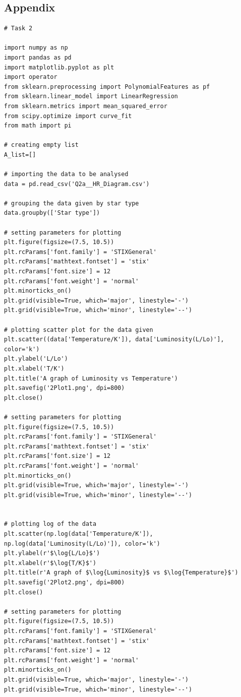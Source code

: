 \documentclass[12pt, a4paper]{article}
\begin{document}
\subsection{Appendix}
\begin{verbatim}
# Task 2

import numpy as np
import pandas as pd
import matplotlib.pyplot as plt
import operator
from sklearn.preprocessing import PolynomialFeatures as pf
from sklearn.linear_model import LinearRegression
from sklearn.metrics import mean_squared_error
from scipy.optimize import curve_fit
from math import pi

# creating empty list
A_list=[]

# importing the data to be analysed
data = pd.read_csv('Q2a__HR_Diagram.csv')

# grouping the data given by star type
data.groupby(['Star type'])

# setting parameters for plotting
plt.figure(figsize=(7.5, 10.5))
plt.rcParams['font.family'] = 'STIXGeneral'
plt.rcParams['mathtext.fontset'] = 'stix'
plt.rcParams['font.size'] = 12
plt.rcParams['font.weight'] = 'normal'
plt.minorticks_on()
plt.grid(visible=True, which='major', linestyle='-')
plt.grid(visible=True, which='minor', linestyle='--')

# plotting scatter plot for the data given
plt.scatter((data['Temperature/K']), data['Luminosity(L/Lo)'], color='k')
plt.ylabel('L/Lo')
plt.xlabel('T/K')
plt.title('A graph of Luminosity vs Temperature')
plt.savefig('2Plot1.png', dpi=800)
plt.close()

# setting parameters for plotting
plt.figure(figsize=(7.5, 10.5))
plt.rcParams['font.family'] = 'STIXGeneral'
plt.rcParams['mathtext.fontset'] = 'stix'
plt.rcParams['font.size'] = 12
plt.rcParams['font.weight'] = 'normal'
plt.minorticks_on()
plt.grid(visible=True, which='major', linestyle='-')
plt.grid(visible=True, which='minor', linestyle='--')


# plotting log of the data
plt.scatter(np.log(data['Temperature/K']), np.log(data['Luminosity(L/Lo)']), color='k')
plt.ylabel(r'$\log{L/Lo}$')
plt.xlabel(r'$\log{T/K}$')
plt.title(r'A graph of $\log{Luminosity}$ vs $\log{Temperature}$')
plt.savefig('2Plot2.png', dpi=800)
plt.close()

# setting parameters for plotting
plt.figure(figsize=(7.5, 10.5))
plt.rcParams['font.family'] = 'STIXGeneral'
plt.rcParams['mathtext.fontset'] = 'stix'
plt.rcParams['font.size'] = 12
plt.rcParams['font.weight'] = 'normal'
plt.minorticks_on()
plt.grid(visible=True, which='major', linestyle='-')
plt.grid(visible=True, which='minor', linestyle='--')


\end{verbatim}
\end{document}
